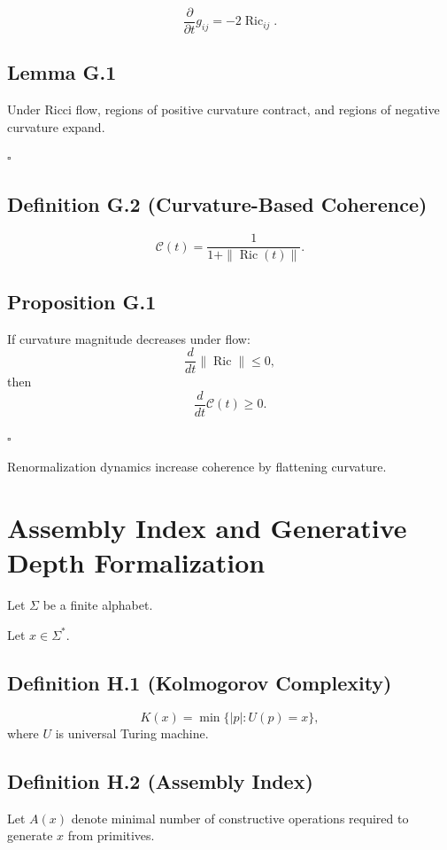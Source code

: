 \documentclass[12pt]{article}
\begin{document}
\[
\frac{\partial}{\partial t} g_{ij}
=
-2 \operatorname{Ric}_{ij}.
\]

\subsection*{Lemma G.1}

Under Ricci flow, regions of positive curvature contract, and regions of negative curvature expand.

\hfill $\square$

\subsection*{Definition G.2 (Curvature-Based Coherence)}

\[
\mathcal{C}(t)
=
\frac{1}{1 + \| \operatorname{Ric}(t) \|}.
\]

\subsection*{Proposition G.1}

If curvature magnitude decreases under flow:
\[
\frac{d}{dt} \| \operatorname{Ric} \| \le 0,
\]
then
\[
\frac{d}{dt} \mathcal{C}(t) \ge 0.
\]

\hfill $\square$

Renormalization dynamics increase coherence by flattening curvature.

\section{Assembly Index and Generative Depth Formalization}

Let $\Sigma$ be a finite alphabet.

Let $x \in \Sigma^\ast$.

\subsection*{Definition H.1 (Kolmogorov Complexity)}

\[
K(x)
=
\min \{ |p| : U(p) = x \},
\]
where $U$ is universal Turing machine.

\subsection*{Definition H.2 (Assembly Index)}

Let $A(x)$ denote minimal number of constructive operations required to generate $x$ from primitives.
\end{document}
